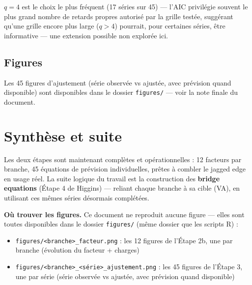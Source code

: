 \documentclass[11pt,a4paper]{article}
\begin{document}
\begin{intuition}
$q=4$ est le choix le plus fréquent (17 séries sur 45) --- l'AIC privilégie souvent le plus grand nombre de retards propres autorisé par la grille testée, suggérant qu'une grille encore plus large ($q>4$) pourrait, pour certaines séries, être informative --- une extension possible non explorée ici.
\end{intuition}

\subsection{Figures}

Les 45 figures d'ajustement (série observée vs ajustée, avec prévision quand disponible) sont disponibles dans le dossier \texttt{figures/} --- voir la note finale du document.

\section{Synthèse et suite}

\begin{resultatbox}
Les deux étapes sont maintenant complètes et opérationnelles : 12 facteurs par branche, 45 équations de prévision individuelles, prêtes à combler le jagged edge en usage réel. La suite logique du travail est la construction des \textbf{bridge equations} (Étape 4 de Higgins) --- reliant chaque branche à sa cible (VA), en utilisant ces mêmes séries désormais complétées.
\end{resultatbox}

\begin{ancrebox}
\textbf{Où trouver les figures.} Ce document ne reproduit aucune figure --- elles sont toutes disponibles dans le dossier \texttt{figures/} (même dossier que les scripts R) :
\begin{itemize}[leftmargin=1.3em]
\item \texttt{figures/<branche>\_facteur.png} : les 12 figures de l'Étape 2b, une par branche (évolution du facteur + charges)
\item \texttt{figures/<branche>\_<série>\_ajustement.png} : les 45 figures de l'Étape 3, une par série (série observée vs ajustée, avec prévision quand disponible)
\end{itemize}
\end{ancrebox}
\end{document}
